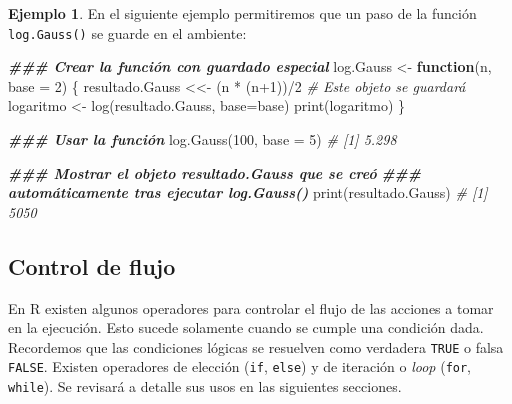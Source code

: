 \documentclass[
]{article}
\newenvironment{Shaded}{\begin{snugshade}}{\end{snugshade}}
\newcommand{\AttributeTok}[1]{\textcolor[rgb]{0.77,0.63,0.00}{#1}}
\newcommand{\CommentTok}[1]{\textcolor[rgb]{0.56,0.35,0.01}{\textit{#1}}}
\newcommand{\ControlFlowTok}[1]{\textcolor[rgb]{0.13,0.29,0.53}{\textbf{#1}}}
\newcommand{\DecValTok}[1]{\textcolor[rgb]{0.00,0.00,0.81}{#1}}
\newcommand{\DocumentationTok}[1]{\textcolor[rgb]{0.56,0.35,0.01}{\textbf{\textit{#1}}}}
\newcommand{\FunctionTok}[1]{\textcolor[rgb]{0.00,0.00,0.00}{#1}}
\newcommand{\NormalTok}[1]{#1}
\newcommand{\OtherTok}[1]{\textcolor[rgb]{0.56,0.35,0.01}{#1}}
\newcommand{\SpecialCharTok}[1]{\textcolor[rgb]{0.00,0.00,0.00}{#1}}
\theoremstyle{definition}
\theoremstyle{definition}
\newtheorem{example}{Ejemplo}[section]
\theoremstyle{definition}
\theoremstyle{definition}
\theoremstyle{remark}
\begin{document}
\begin{example}

En el siguiente ejemplo permitiremos que un paso de la función \texttt{log.Gauss()} se guarde en el ambiente:

\begin{Shaded}
\begin{Highlighting}[]
\DocumentationTok{\#\#\# Crear la función con guardado especial}
\NormalTok{log.Gauss }\OtherTok{\textless{}{-}} \ControlFlowTok{function}\NormalTok{(n, }\AttributeTok{base =} \DecValTok{2}\NormalTok{) \{}
\NormalTok{  resultado.Gauss }\OtherTok{\textless{}\textless{}{-}}\NormalTok{ (n }\SpecialCharTok{*}\NormalTok{ (n}\SpecialCharTok{+}\DecValTok{1}\NormalTok{))}\SpecialCharTok{/}\DecValTok{2}   \CommentTok{\# Este objeto se guardará}
\NormalTok{  logaritmo }\OtherTok{\textless{}{-}} \FunctionTok{log}\NormalTok{(resultado.Gauss, }\AttributeTok{base=}\NormalTok{base)}
  \FunctionTok{print}\NormalTok{(logaritmo)}
\NormalTok{\}}

\DocumentationTok{\#\#\# Usar la función}
\FunctionTok{log.Gauss}\NormalTok{(}\DecValTok{100}\NormalTok{, }\AttributeTok{base =} \DecValTok{5}\NormalTok{)}
\CommentTok{\# [1] 5.298}

\DocumentationTok{\#\#\# Mostrar el objeto resultado.Gauss que se creó }
\DocumentationTok{\#\#\# automáticamente tras ejecutar log.Gauss()}
\FunctionTok{print}\NormalTok{(resultado.Gauss)}
\CommentTok{\# [1] 5050}
\end{Highlighting}
\end{Shaded}

\end{example}

\hypertarget{control-de-flujo}{%
\subsection{Control de flujo}\label{control-de-flujo}}

En R existen algunos operadores para controlar el flujo de las acciones a tomar en la ejecución. Esto sucede solamente cuando se cumple una condición dada. Recordemos que las condiciones lógicas se resuelven como verdadera \texttt{TRUE} o falsa \texttt{FALSE}. Existen operadores de elección (\texttt{if}, \texttt{else}) y de iteración o \emph{loop} (\texttt{for}, \texttt{while}). Se revisará a detalle sus usos en las siguientes secciones.
\end{document}

